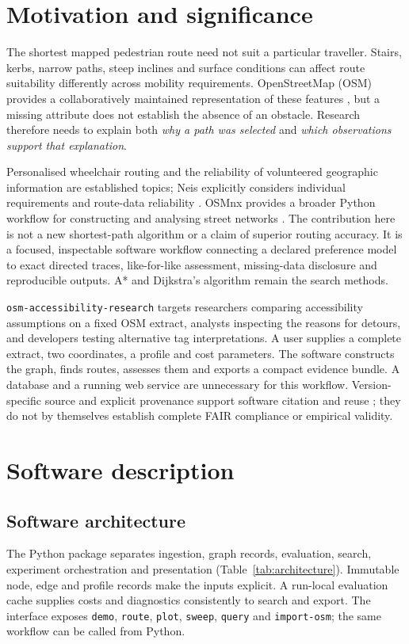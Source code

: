 \documentclass[preprint,12pt,a4paper]{elsarticle}
\newcommand{\software}{\texttt{osm-\allowbreak accessibility-\allowbreak research}}
\begin{document}
\section{Motivation and significance}
\label{sec:motivation}
The shortest mapped pedestrian route need not suit a particular traveller.
Stairs, kerbs, narrow paths, steep inclines and surface conditions can affect
route suitability differently across mobility requirements. OpenStreetMap (OSM)
provides a collaboratively maintained representation of these features
\cite{haklay2008}, but a missing attribute does not establish the absence of an
obstacle. Research therefore needs to explain both \emph{why a path was selected}
and \emph{which observations support that explanation}.

Personalised wheelchair routing and the reliability of volunteered geographic
information are established topics; Neis explicitly considers individual
requirements and route-data reliability \cite{neis2015}. OSMnx provides a broader
Python workflow for constructing and analysing street networks
\cite{boeing2017}. The contribution here is not a new shortest-path algorithm
or a claim of superior routing accuracy. It is a focused, inspectable software
workflow connecting a declared preference model to exact directed traces,
like-for-like assessment, missing-data disclosure and reproducible outputs.
A* \cite{hart1968} and Dijkstra's algorithm \cite{dijkstra1959} remain the search
methods.

\software{} targets researchers comparing accessibility assumptions on a fixed
OSM extract, analysts inspecting the reasons for detours, and developers testing
alternative tag interpretations. A user supplies a complete extract, two
coordinates, a profile and cost parameters. The software constructs the graph,
finds routes, assesses them and exports a compact evidence bundle. A database
and a running web service are unnecessary for this workflow. Version-specific
source and explicit provenance support software citation and reuse
\cite{smith2016,barker2022}; they do not by themselves establish complete FAIR
compliance or empirical validity.

\section{Software description}
\label{sec:software}
\subsection{Software architecture}
\label{sec:architecture}
The Python package separates ingestion, graph records, evaluation, search,
experiment orchestration and presentation (Table~\ref{tab:architecture}).
Immutable node, edge and profile records make the inputs explicit. A run-local
evaluation cache supplies costs and diagnostics consistently to search and export.
The interface exposes \texttt{demo}, \texttt{route},
\texttt{plot}, \texttt{sweep}, \texttt{query} and \texttt{import-osm}; the same
workflow can be called from Python.
\end{document}
